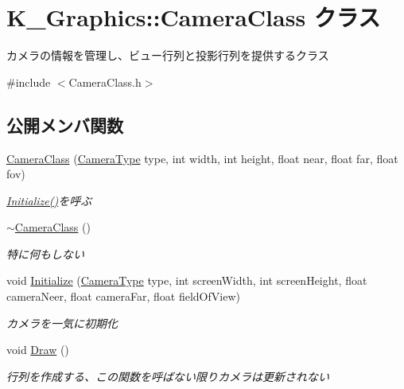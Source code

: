 \hypertarget{class_k___graphics_1_1_camera_class}{}\section{K\+\_\+\+Graphics\+:\+:Camera\+Class クラス}
\label{class_k___graphics_1_1_camera_class}


カメラの情報を管理し、ビュー行列と投影行列を提供するクラス  




{\ttfamily \#include $<$Camera\+Class.\+h$>$}

\subsection*{公開メンバ関数}
\begin{DoxyCompactItemize}
\item 
\mbox{\hyperlink{class_k___graphics_1_1_camera_class_a2b371f16a80374ab07522af4bfe8f97c}{Camera\+Class}} (\mbox{\hyperlink{namespace_k___graphics_a46f486e742ad696f88bfbeb22f8af10f}{Camera\+Type}} type, int width, int height, float near, float far, float fov)
\begin{DoxyCompactList}\small\item\em \mbox{\hyperlink{class_k___graphics_1_1_camera_class_af9efd95b7a5b0285c5bda70ca01a002a}{Initialize()}}を呼ぶ \end{DoxyCompactList}\item 
\mbox{\hyperlink{class_k___graphics_1_1_camera_class_a6fadd430bd4da7c246c8e2042c5693af}{$\sim$\+Camera\+Class}} ()
\begin{DoxyCompactList}\small\item\em 特に何もしない \end{DoxyCompactList}\item 
void \mbox{\hyperlink{class_k___graphics_1_1_camera_class_af9efd95b7a5b0285c5bda70ca01a002a}{Initialize}} (\mbox{\hyperlink{namespace_k___graphics_a46f486e742ad696f88bfbeb22f8af10f}{Camera\+Type}} type, int screen\+Width, int screen\+Height, float camera\+Neer, float camera\+Far, float field\+Of\+View)
\begin{DoxyCompactList}\small\item\em カメラを一気に初期化 \end{DoxyCompactList}\item 
void \mbox{\hyperlink{class_k___graphics_1_1_camera_class_a9ca92b03f3171a749da3fabd77743e05}{Draw}} ()
\begin{DoxyCompactList}\small\item\em 行列を作成する、この関数を呼ばない限りカメラは更新されない \end{DoxyCompactList}\item 

\end{DoxyCompactItemize}
